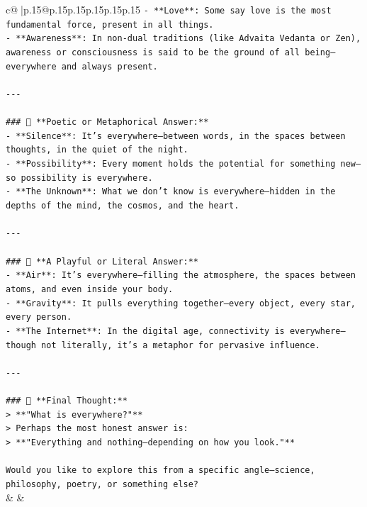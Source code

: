 \documentclass{article}
\begin{document}
{\begin{supertabular}{c@{$\;$}|p{.15\linewidth}@{}p{.15\linewidth}p{.15\linewidth}p{.15\linewidth}p{.15\linewidth}p{.15\linewidth}}
{{{\texttt{{-} **Love**: Some say love is the most fundamental force, present in all things.} \\
\texttt{{-} **Awareness**: In non{-}dual traditions (like Advaita Vedanta or Zen), awareness or consciousness is said to be the ground of all being—everywhere and always present.} \\
\\ 
\texttt{{-}{-}{-}} \\
\\ 
\texttt{\#\#\# 🧩 **Poetic or Metaphorical Answer:**} \\
\texttt{{-} **Silence**: It’s everywhere—between words, in the spaces between thoughts, in the quiet of the night.} \\
\texttt{{-} **Possibility**: Every moment holds the potential for something new—so possibility is everywhere.} \\
\texttt{{-} **The Unknown**: What we don’t know is everywhere—hidden in the depths of the mind, the cosmos, and the heart.} \\
\\ 
\texttt{{-}{-}{-}} \\
\\ 
\texttt{\#\#\# 🤔 **A Playful or Literal Answer:**} \\
\texttt{{-} **Air**: It’s everywhere—filling the atmosphere, the spaces between atoms, and even inside your body.} \\
\texttt{{-} **Gravity**: It pulls everything together—every object, every star, every person.} \\
\texttt{{-} **The Internet**: In the digital age, connectivity is everywhere—though not literally, it’s a metaphor for pervasive influence.} \\
\\ 
\texttt{{-}{-}{-}} \\
\\ 
\texttt{\#\#\# 🎯 **Final Thought:**} \\
\texttt{> **"What is everywhere?"**  } \\
\texttt{> Perhaps the most honest answer is:  } \\
\texttt{> **"Everything and nothing—depending on how you look."**} \\
\\ 
\texttt{Would you like to explore this from a specific angle—science, philosophy, poetry, or something else?} \\
            }
        }
    }
    & & \\ \\


\end{supertabular}}
\end{document}
